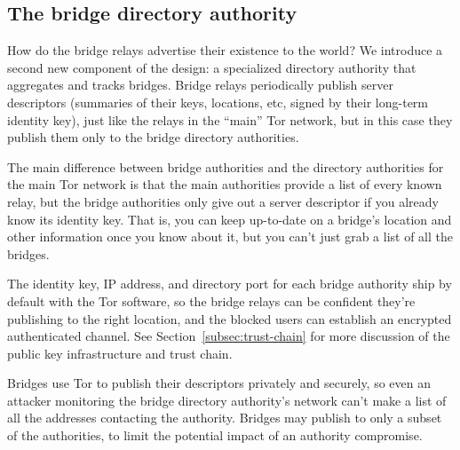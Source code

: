 \documentclass{llncs}
\begin{document}

\subsection{The bridge directory authority}

How do the bridge relays advertise their existence to the world? We
introduce a second new component of the design: a specialized directory
authority that aggregates and tracks bridges. Bridge relays periodically
publish server descriptors (summaries of their keys, locations, etc,
signed by their long-term identity key), just like the relays in the
``main'' Tor network, but in this case they publish them only to the
bridge directory authorities.

The main difference between bridge authorities and the directory
authorities for the main Tor network is that the main authorities provide
a list of every known relay, but the bridge authorities only give
out a server descriptor if you already know its identity key. That is,
you can keep up-to-date on a bridge's location and other information
once you know about it, but you can't just grab a list of all the bridges.

The identity key, IP address, and directory port for each bridge
authority ship by default with the Tor software, so the bridge relays
can be confident they're publishing to the right location, and the
blocked users can establish an encrypted authenticated channel. See
Section~\ref{subsec:trust-chain} for more discussion of the public key
infrastructure and trust chain.

Bridges use Tor to publish their descriptors privately and securely,
so even an attacker monitoring the bridge directory authority's network
can't make a list of all the addresses contacting the authority.
Bridges may publish to only a subset of the
authorities, to limit the potential impact of an authority compromise.
\end{document}
